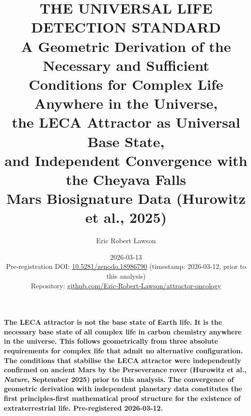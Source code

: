 \documentclass[11pt, a4paper]{article}
\begin{document}
\title{
  \large\bfseries\color{headerblue}
  THE UNIVERSAL LIFE DETECTION STANDARD\\[0.4em]
  \normalsize\color{headerblue}
  A Geometric Derivation of the Necessary and Sufficient
  Conditions for Complex Life Anywhere in the Universe,\\
  the LECA Attractor as Universal Base State,\\
  and Independent Convergence with the Cheyava Falls\\
  Mars Biosignature Data (Hurowitz et al., 2025)
}

\author[1]{Eric Robert Lawson}

\date{2026-03-13\\[0.3em]
  \footnotesize
  Pre-registration DOI:
  \href{https://doi.org/10.5281/zenodo.18986790}
  {10.5281/zenodo.18986790}
  (timestamp: 2026-03-12,
  prior to this analysis)\\
  Repository:
  \href{https://github.com/Eric-Robert-Lawson/attractor-oncology}
  {github.com/Eric-Robert-Lawson/attractor-oncology}
}

\maketitle
\thispagestyle{empty}

\begin{mdframed}[
  backgroundcolor=boxblue,
  linecolor=boxblue,
  linewidth=0pt,
  innertopmargin=0.5em,
  innerbottommargin=0.5em,
  innerleftmargin=1em,
  innerrightmargin=1em
]
\begin{center}
\small\bfseries\color{white}
The LECA attractor is not the base state of Earth life.
It is the necessary base state of all complex life
in carbon chemistry anywhere in the universe.
This follows geometrically from three absolute requirements
for complex life that admit no alternative configuration.
The conditions that stabilise the LECA attractor
were independently confirmed on ancient Mars
by the Perseverance rover (Hurowitz et al.,
\textit{Nature}, September 2025) prior to this analysis.
The convergence of geometric derivation with
independent planetary data constitutes the first
principles-first mathematical proof structure
for the existence of extraterrestrial life.
Pre-registered 2026-03-12.
\end{center}
\end{mdframed}
\end{document}
